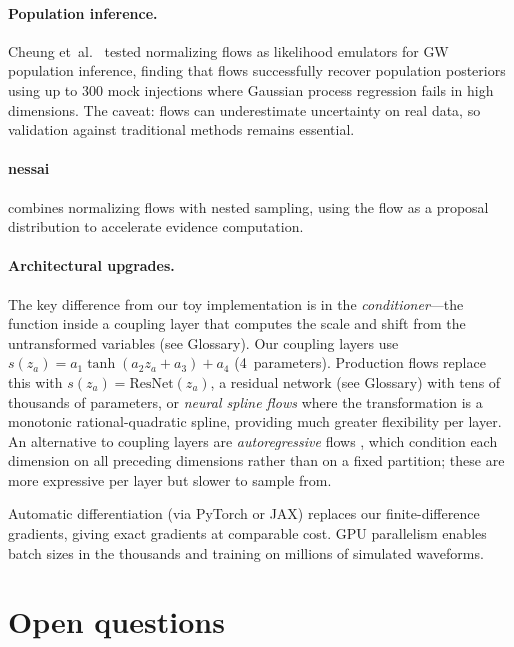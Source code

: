 \documentclass[11pt,letterpaper]{article}
\begin{document}
\paragraph{Population inference.}
Cheung et~al.\ \cite{cheung2022} tested normalizing flows as
likelihood emulators for GW population inference, finding that flows
successfully recover population posteriors using up to 300 mock
injections where Gaussian process regression fails in high dimensions.
The caveat: flows can underestimate uncertainty on real data, so
validation against traditional methods remains essential.

\paragraph{nessai} \cite{williams2021} combines normalizing flows with
nested sampling, using the flow as a proposal distribution to
accelerate evidence computation.

\paragraph{Architectural upgrades.}
The key difference from our toy implementation is in the
\emph{conditioner}---the function inside a coupling layer that computes
the scale and shift from the untransformed variables (see Glossary).
Our coupling layers use $s(z_a) = a_1 \tanh(a_2 z_a + a_3) + a_4$
(4~parameters).
Production flows replace this with $s(z_a) = \mathrm{ResNet}(z_a)$,
a residual network (see Glossary) with tens of thousands of parameters,
or \emph{neural spline flows} \cite{durkan2019} where the
transformation is a monotonic rational-quadratic spline, providing
much greater flexibility per layer.
An alternative to coupling layers are \emph{autoregressive} flows
\cite{kingma2016,papamakarios2017}, which condition each dimension on
all preceding dimensions rather than on a fixed partition; these are
more expressive per layer but slower to sample from.

Automatic differentiation (via PyTorch or JAX) replaces our
finite-difference gradients, giving exact gradients at comparable cost.
GPU parallelism enables batch sizes in the thousands and training on
millions of simulated waveforms.


\section{Open questions}
\label{sec:open}
\end{document}
